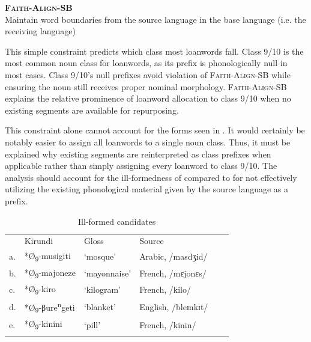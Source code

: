 \documentclass[output=paper,colorlinks,citecolor=brown,
]{langscibook}
\begin{document}
\ea \label{ex:kinchsular:fasb}
       \textbf{\textsc{Faith-Align-SB}} \\
        Maintain word boundaries from the source language in the base language (i.e. the receiving language)\footnotemark{}
\z 


    This simple constraint predicts which class most loanwords fall. Class 9/10 is the most common noun class for loanwords, as its prefix is phonologically null in most cases. Class 9/10's null prefixes avoid violation of \textsc{Faith-Align-SB} while ensuring the noun still receives proper nominal morphology. \textsc{Faith-Align-SB} explains the relative prominence of loanword allocation to class 9/10 when no existing segments are available for repurposing. 

This constraint alone cannot account for the forms seen in . It would certainly be notably easier to assign all loanwords to a single noun class. Thus, it must be explained why existing segments are reinterpreted as class prefixes when applicable rather than simply assigning every loanword to class 9/10. The analysis should account for the ill-formedness of  compared to  for not effectively utilizing the existing phonological material given by the source language as a prefix.

\begin{table}
\caption{Ill-formed candidates}
\label{tab:kinchsular:illformed2}
\begin{tabular}{llllll}
  \lsptoprule
        & {Kirundi} & {Gloss} & {Source} \\
         a. & *Ø\textsubscript{9}-musigiti & `mosque' & Arabic, /masdʒid/ \\ 
            b. & *Ø\textsubscript{9}-majoneze & `mayonnaise' & French, /mɛjonɛs/ \\ 
            c. & *Ø\textsubscript{9}-kiro & `kilogram' & French, /kilo/ \\
            d. & *Ø\textsubscript{9}-βure\textsuperscript{n}geti & `blanket' & English, /bleɪnkɪt/  \\
         e. & *Ø\textsubscript{9}-kinini & `pill' & French, /kinin/ \\
  \lspbottomrule
\end{tabular}
\end{table}
\end{document}
